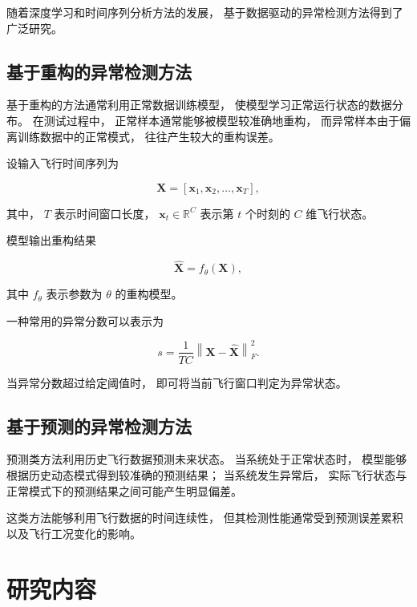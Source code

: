 \documentclass[
  degree=master,
  degree-type=academic
]{gzuthesis}
\begin{document}
随着深度学习和时间序列分析方法的发展，
基于数据驱动的异常检测方法得到了广泛研究。

\subsection{基于重构的异常检测方法}

基于重构的方法通常利用正常数据训练模型，
使模型学习正常运行状态的数据分布。
在测试过程中，
正常样本通常能够被模型较准确地重构，
而异常样本由于偏离训练数据中的正常模式，
往往产生较大的重构误差。

设输入飞行时间序列为

\begin{equation}
    \mathbf{X}
    =
    \left[
        \mathbf{x}_1,
        \mathbf{x}_2,
        \ldots,
        \mathbf{x}_T
    \right],
\end{equation}

其中，
$T$ 表示时间窗口长度，
$\mathbf{x}_t \in \mathbb{R}^{C}$ 表示第 $t$ 个时刻的
$C$ 维飞行状态。

模型输出重构结果

\begin{equation}
    \hat{\mathbf{X}}
    =
    f_{\theta}(\mathbf{X}),
\end{equation}

其中 $f_{\theta}$ 表示参数为 $\theta$ 的重构模型。

一种常用的异常分数可以表示为

\begin{equation}
    s
    =
    \frac{1}{TC}
    \left\|
        \mathbf{X}
        -
        \hat{\mathbf{X}}
    \right\|_F^2 .
\end{equation}

当异常分数超过给定阈值时，
即可将当前飞行窗口判定为异常状态。


\subsection{基于预测的异常检测方法}

预测类方法利用历史飞行数据预测未来状态。
当系统处于正常状态时，
模型能够根据历史动态模式得到较准确的预测结果；
当系统发生异常后，
实际飞行状态与正常模式下的预测结果之间可能产生明显偏差。

这类方法能够利用飞行数据的时间连续性，
但其检测性能通常受到预测误差累积以及飞行工况变化的影响。


\section{研究内容}
\end{document}
